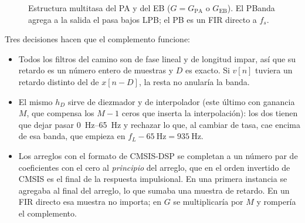 \documentclass[11pt,a4paper]{article}
\begin{document}
\begin{figure}[H]
\centering
{}
\caption{Estructura multitasa del PA y del EB ($G = G_{\text{PA}}$ o
$G_{\text{EB}}$). El PBanda agrega a la salida el pasa bajos LPB; el PB es
un FIR directo a $f_s$.}
\label{fig:multitasa}
\end{figure}

Tres decisiones hacen que el complemento funcione:
\begin{itemize}
  \item Todos los filtros del camino son de fase lineal y de longitud impar,
        así que su retardo es un número entero de muestras y $D$ es exacto.
        Si $v[n]$ tuviera un retardo distinto del de $x[n-D]$, la resta no
        anularía la banda.
  \item El mismo $h_D$ sirve de diezmador y de interpolador (este último
        con ganancia $M$, que compensa los $M-1$ ceros que inserta la
        interpolación): los dos tienen que dejar pasar
        \qtyrange{0}{65}{\hertz} y rechazar lo que, al cambiar de tasa, cae
        encima de esa banda, que empieza en
        $f_L - \qty{65}{\hertz} = \qty{935}{\hertz}$.
  \item Los arreglos con el formato de CMSIS-DSP se completan a un número
        par de coeficientes con el cero al \emph{principio} del arreglo, que
        en el orden invertido de CMSIS es el final de la respuesta
        impulsional. En una primera instancia se agregaba al final del
        arreglo, lo que sumaba una muestra de retardo. En un FIR directo esa
        muestra no importa; en $G$ se multiplicaría por $M$ y rompería el
        complemento.
\end{itemize}
\end{document}
